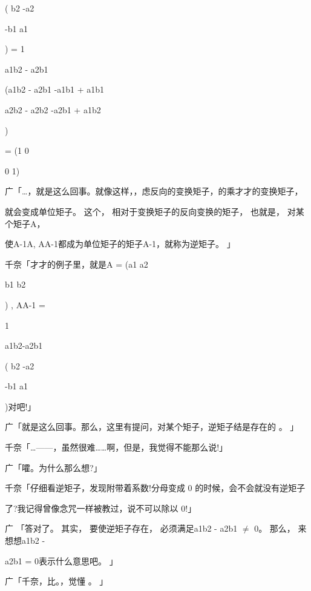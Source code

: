 ( b2 -a2\par
-b1 a1\par
) = 1\par
a1b2 - a2b1\par
(a1b2 - a2b1 -a1b1 + a1b1\par
a2b2 - a2b2 -a2b1 + a1b2\par
)\par
= (1 0\par
0 1)\par
广「…，就是这么回事。就像这样，，虑反向的变换矩子，的乘才才的变换矩子，\par
就会变成单位矩子。 这个， 相对于变换矩子的反向变换的矩子， 也就是， 对某个矩子A，\par
使A-1A, AA-1都成为单位矩子的矩子A-1，就称为逆矩子。 」\par
千奈「才才的例子里，就是A = (a1 a2\par
b1 b2\par
) , AA-1 =\par
1\par
a1b2-a2b1\par
( b2 -a2\par
-b1 a1\par
)对吧!」\par
广「就是这么回事。那么，这里有提问，对某个矩子，逆矩子结是存在的 。 」\par
千奈「…——，虽然很难……啊，但是，我觉得不能那么说!」\par
广「嚯。为什么那么想?」\par
千奈「仔细看逆矩子，发现附带着系数!分母变成 0 的时候，会不会就没有逆矩子\par
了?我记得曾像念咒一样被教过，说不可以除以 0!」\par
广 「答对了。 其实， 要使逆矩子存在， 必须满足a1b2 - a2b1 $\neq$ 0。 那么， 来想想a1b2 -\par
a2b1 = 0表示什么意思吧。 」\par
广「千奈，比。，觉懂 。 」\par

